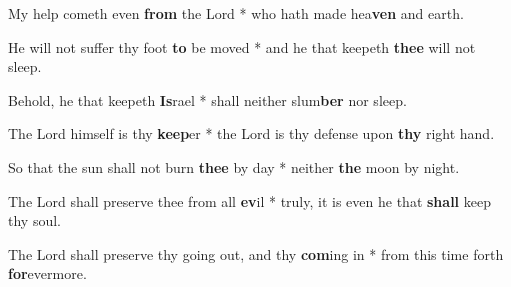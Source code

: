 \begin{multicols}{2}
	My help cometh even \textbf{from} the Lord * who hath made hea\textbf{ven} and earth.
	
	He will not suffer thy foot \textbf{to} be moved * and he that keepeth \textbf{thee} will not sleep.
	
	Behold, he that keepeth \textbf{Is}rael * shall neither slum\textbf{ber} nor sleep.
	
	The Lord himself is thy \textbf{keep}er * the Lord is thy defense upon \textbf{thy} right hand.
	
	So that the sun shall not burn \textbf{thee} by day * neither \textbf{the} moon by night.
	
	The Lord shall preserve thee from all \textbf{ev}il * truly, it is even he that \textbf{shall} keep thy soul.
	
	The Lord shall preserve thy going out, and thy \textbf{com}ing in * from this time forth \textbf{for}evermore.
\end{multicols}
